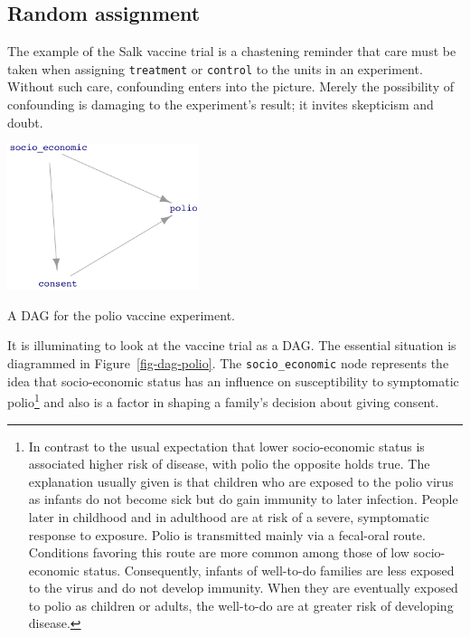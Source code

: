 \documentclass[
  letterpaper,
  DIV=11,
  numbers=noendperiod,
  oneside]{scrreprt}
\begin{document}
{\begin{footnotesize}
\hypertarget{random-assignment}{%
\section{Random assignment}\label{random-assignment}}

The example of the Salk vaccine trial is a chastening reminder that care
must be taken when assigning \texttt{treatment} or \texttt{control} to
the units in an experiment. Without such care, confounding enters into
the picture. Merely the possibility of confounding is damaging to the
experiment's result; it invites skepticism and doubt.

\begin{marginfigure}

{\centering \includegraphics[width=2.21in,height=\textheight]{./www/DAG-consent1.png}

}

\caption{\label{fig-dag-polio}A DAG for the polio vaccine experiment.}

\end{marginfigure}

It is illuminating to look at the vaccine trial as a DAG. The essential
situation is diagrammed in Figure~\ref{fig-dag-polio}. The
\texttt{socio\_economic} node represents the idea that socio-economic
status has an influence on susceptibility to symptomatic
polio\footnote{In contrast to the usual expectation that lower
  socio-economic status is associated higher risk of disease, with polio
  the opposite holds true. The explanation usually given is that
  children who are exposed to the polio virus as infants do not become
  sick but do gain immunity to later infection. People later in
  childhood and in adulthood are at risk of a severe, symptomatic
  response to exposure. Polio is transmitted mainly via a fecal-oral
  route. Conditions favoring this route are more common among those of
  low socio-economic status. Consequently, infants of well-to-do
  families are less exposed to the virus and do not develop immunity.
  When they are eventually exposed to polio as children or adults, the
  well-to-do are at greater risk of developing disease.} and also is a
factor in shaping a family's decision about giving consent.


\end{footnotesize}}
\end{document}
